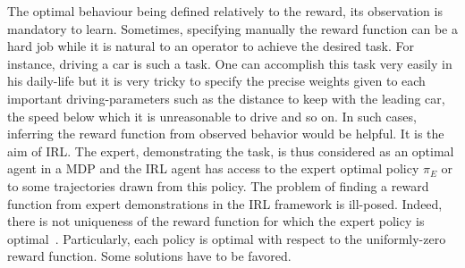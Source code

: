 \documentclass{article}
\begin{document}
%
The optimal behaviour being defined relatively to the reward, its
observation is mandatory to learn. Sometimes, specifying manually
the reward function can be a hard job while it is natural to an
operator to achieve the desired task. For instance, driving a car is
such a task. One can accomplish this task very easily in his
daily-life but it is very tricky to specify the precise weights
given to each important driving-parameters such as the distance to
keep with the leading car, the speed below which it is unreasonable
to drive and so on. In such cases, inferring the reward function
from observed behavior would be helpful.
%
%
It is the aim of IRL. The expert, demonstrating the task, is thus
considered as an optimal agent in a MDP and the IRL agent has access
to the expert optimal policy $\pi_E$ or to some trajectories drawn
from this policy.
%
The problem of finding a reward function from expert demonstrations
in the IRL framework is ill-posed. Indeed, there is not uniqueness
of the reward function for which the expert policy is
optimal~\cite{ng1999policy}. Particularly, each policy is
optimal with respect to the uniformly-zero reward function. Some
solutions have to be favored.
\end{document}
